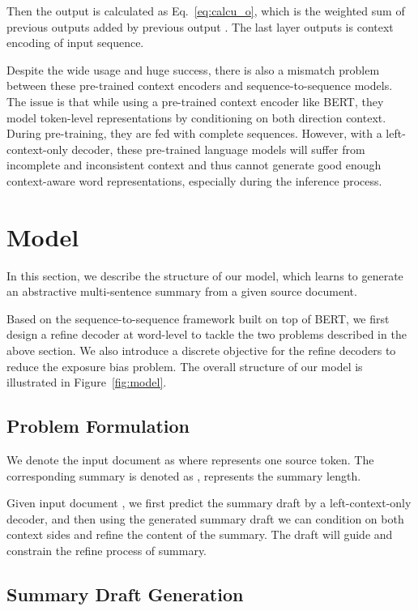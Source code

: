 \documentclass{article}
\begin{document}
Then the output is calculated as Eq.~\eqref{eq:calcu_o}, which is the weighted sum of previous outputs  added by previous output . The last layer outputs is context encoding of input sequence.



Despite the wide usage and huge success, there is also a mismatch problem between these pre-trained context encoders and sequence-to-sequence models. The issue is that while using a pre-trained context encoder like BERT, they model token-level representations by conditioning on both direction context. During pre-training, they are fed with complete sequences. However, with a left-context-only decoder, these pre-trained language models will suffer from incomplete and inconsistent context and thus cannot generate good enough context-aware word representations, especially during the inference process. 

\section{Model}

In this section, we describe the structure of our model, which learns to generate an abstractive multi-sentence summary from a given source document. 

Based on the sequence-to-sequence framework built on top of BERT, we first design a refine decoder at word-level to tackle the two problems described in the above section. We also introduce a discrete objective for the refine decoders to reduce the exposure bias problem. The overall structure of our model is illustrated in Figure~\ref{fig:model}. 

\subsection{Problem Formulation}

We denote the input document as  where  represents one source token. The corresponding summary is denoted as ,  represents the summary length.

 Given input document , we first predict the summary draft by a left-context-only decoder, and then using the generated summary draft we can condition on both context sides and refine the content of the summary. The draft will guide and constrain the refine process of summary.
 
\subsection{Summary Draft Generation}
\end{document}
